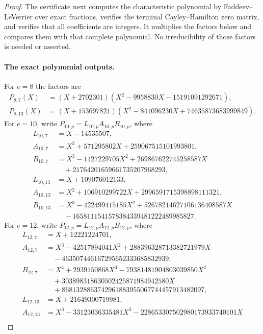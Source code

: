 \begin{proof}
The certificate next computes the characteristic polynomial by
Faddeev--LeVerrier over exact fractions, verifies the terminal
Cayley--Hamilton zero matrix, and verifies that all coefficients
are integers. It multiplies the factors below and compares them
with that complete polynomial. No irreducibility of those factors
is needed or asserted.

\paragraph{The exact polynomial outputs.}
For $e=8$ the factors are
\[
\begin{aligned}
 P_{8,7}(X)&=(X+2702301)
             (X^2-9958830X-15191091292671),\\
 P_{8,13}(X)&=(X+153697821)
             (X^2-841096230X+74635873683999849).
\end{aligned}
\tag{UG.10}
\]
For $e=10$, write $P_{10,p}=L_{10,p}A_{10,p}B_{10,p}$, where
\[
\begin{aligned}
 L_{10,7}&=X-14535507,\\
 A_{10,7}&=X^2+571295802X+259067515101993801,\\
 B_{10,7}&=X^3-1127229705X^2+269867622745258587X\\
          &\quad+21764201659661735207968293,\\
 L_{10,13}&=X+109076012133,\\
 A_{10,13}&=X^2+106910299722X+2996591715398898111321,\\
 B_{10,13}&=X^3-422499415185X^2+52678214627106136408587X\\
          &\quad-1658111541578384339481222489985827.
\end{aligned}
\tag{UG.11}
\]
For $e=12$, write $P_{12,p}=L_{12,p}A_{12,p}B_{12,p}$, where
\[
\begin{aligned}
 L_{12,7}&=X+12221224701,\\
 A_{12,7}&=X^3-42517894041X^2+288396328713382721979X\\
          &\quad-463507446167295652333685832939,\\
 B_{12,7}&=X^4+2939150868X^3-79381481904803039850X^2\\
          &\quad+303898318630502425871984942580X\\
          &\quad+8681328863742961883955067744457913482097,\\
 L_{12,13}&=X+21649300719981,\\
 A_{12,13}&=X^3-33123036335481X^2-228653307502980173933740101X\\

\end{aligned}\]
\end{proof}
